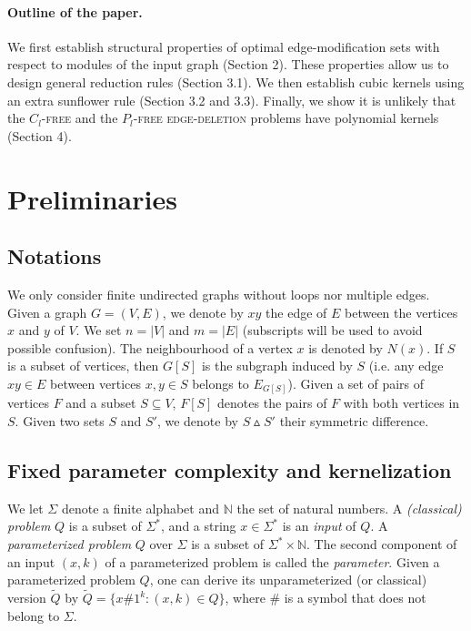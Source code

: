 \documentclass[11pt]{article}
\begin{document}
\paragraph{Outline of the paper.}
We first establish structural properties of optimal edge-modification sets with respect to modules of the input graph (Section 2). These properties allow us to design general reduction rules (Section 3.1). We then establish cubic kernels using an extra sunflower rule (Section 3.2 and 3.3). Finally, we show it is unlikely that the \textsc{$C_l$-free} and the \textsc{$P_l$-free edge-deletion} problems have polynomial kernels (Section 4).









\section{Preliminaries}

\subsection{Notations} 

We only consider finite undirected graphs without loops nor multiple edges. Given a graph $G=(V,E)$, we denote by $xy$ the edge of $E$ between the vertices $x$ and $y$ of $V$. We set $n=|V|$ and $m=|E|$ (subscripts will be used to avoid possible confusion). The neighbourhood of a vertex $x$ is denoted by $N(x)$. If $S$ is a subset of vertices, then $G[S]$ is the subgraph induced by $S$ (i.e. any edge $xy\in E$ between vertices $x,y\in S$ belongs to $E_{G[S]}$). Given a set of pairs of vertices $F$ and a subset $S \subseteq V$, $F[S]$ denotes the pairs of $F$ with both vertices in $S$. Given two sets $S$ and $S'$, we denote by $S\vartriangle S'$ their symmetric difference.

\subsection{Fixed parameter complexity and kernelization}

We let $\Sigma$ denote a finite alphabet and $\mathbb{N}$ the set of natural numbers. A \emph{(classical) problem} $Q$ is a subset of $\Sigma^*$, and a string $x\in \Sigma^*$ is an \emph{input} of $Q$. A \emph{parameterized problem} $Q$ over $\Sigma$ is a subset of $\Sigma^*\times \mathbb{N}$. The second component of an input $(x,k)$ of a parameterized problem is called the \emph{parameter}. Given a parameterized problem $Q$, one can derive its unparameterized (or classical) version $\tilde{Q}$ by $\tilde{Q}=\{x\#1^k:(x,k)\in Q\}$, where $\#$ is a symbol that does not belong to $\Sigma$.
\end{document}
